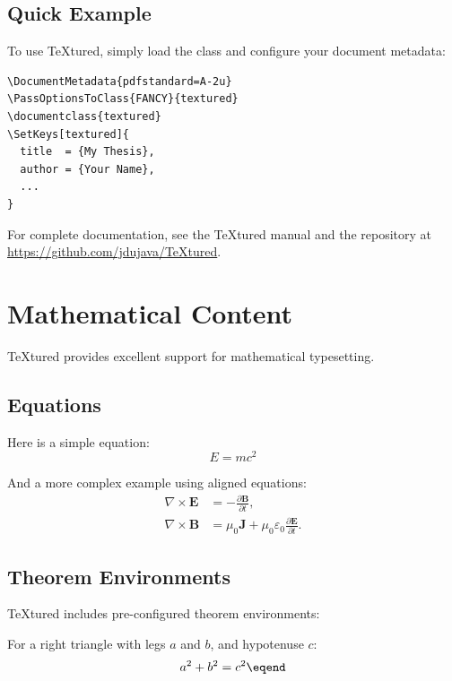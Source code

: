 \documentclass[12pt,a4paper]{textured}
\begin{document}
\section{Quick Example}

To use TeXtured, simply load the class and configure your document metadata:

\begin{verbatim}
\DocumentMetadata{pdfstandard=A-2u}
\PassOptionsToClass{FANCY}{textured}
\documentclass{textured}
\SetKeys[textured]{
  title  = {My Thesis},
  author = {Your Name},
  ...
}
\end{verbatim}

For complete documentation, see the TeXtured manual and the repository at \url{https://github.com/jdujava/TeXtured}.

\chapter{Mathematical Content}

TeXtured provides excellent support for mathematical typesetting.

\section{Equations}

Here is a simple equation:
\begin{equation}
  E = mc^2
  \label{eq:einstein}
\end{equation}

And a more complex example using aligned equations:
\begin{align}
  \nabla \times \mathbf{E} &= -\frac{\partial \mathbf{B}}{\partial t}, \\
  \nabla \times \mathbf{B} &= \mu_0 \mathbf{J} + \mu_0 \varepsilon_0 \frac{\partial \mathbf{E}}{\partial t}.
\end{align}

\section{Theorem Environments}

TeXtured includes pre-configured theorem environments:

\begin{theorem}
  \label{thm:pythagoras}
  For a right triangle with legs $a$ and $b$, and hypotenuse $c$:
  \begin{equation}
    a^2 + b^2 = c^2 \eqend
  \end{equation}
\end{theorem}
\end{document}
